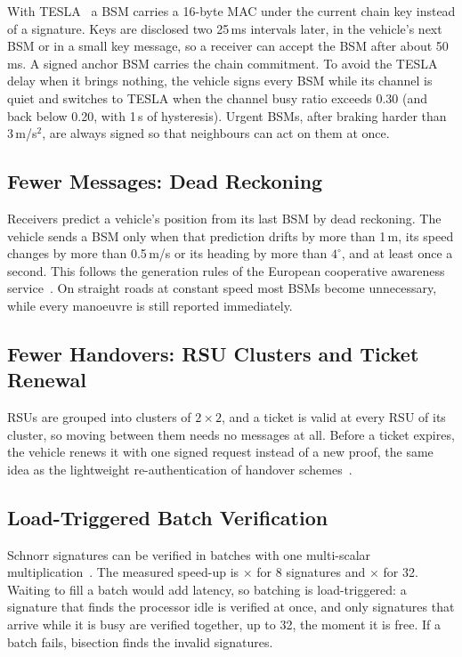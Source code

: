 With TESLA~\cite{perrig2000tesla} a BSM carries a 16-byte MAC under the current chain key instead of a signature. Keys are
disclosed two 25\,ms intervals later, in the vehicle's next BSM or in a small key message, so a
receiver can accept the BSM after about 50\,ms. A signed anchor BSM carries the chain commitment. To
avoid the TESLA delay when it brings nothing, the vehicle signs every BSM while its channel is quiet
and switches to TESLA when the channel busy ratio exceeds 0.30 (and back below 0.20, with 1\,s of
hysteresis). Urgent BSMs, after braking harder than 3\,m/s$^2$, are always signed so that neighbours
can act on them at once.

\subsection{Fewer Messages: Dead Reckoning}

Receivers predict a vehicle's position from its last BSM by dead reckoning. The vehicle sends a BSM
only when that prediction drifts by more than 1\,m, its speed changes by more than 0.5\,m/s or its
heading by more than $4^\circ$, and at least once a second. This follows the generation rules of the
European cooperative awareness service~\cite{etsi302637}. On straight roads at constant speed most
BSMs become unnecessary, while every manoeuvre is still reported immediately.

\subsection{Fewer Handovers: RSU Clusters and Ticket Renewal}

RSUs are grouped into clusters of $2\times2$, and a ticket is valid at every RSU of its cluster, so
moving between them needs no messages at all. Before a ticket expires, the vehicle renews it with one
signed request instead of a new proof, the same idea as the lightweight re-authentication of
handover schemes~\cite{varma2023zkp,xie2023handover}.

\subsection{Load-Triggered Batch Verification}

Schnorr signatures can be verified in batches with one multi-scalar multiplication~\cite{bellare1998batch}.
The measured speed-up is $\times$ for 8 signatures and
$\times$ for 32. Waiting to fill a batch would add latency, so batching is
load-triggered: a signature that finds the processor idle is verified at once, and only signatures
that arrive while it is busy are verified together, up to 32, the moment it is free. If a batch fails,
bisection finds the invalid signatures.

